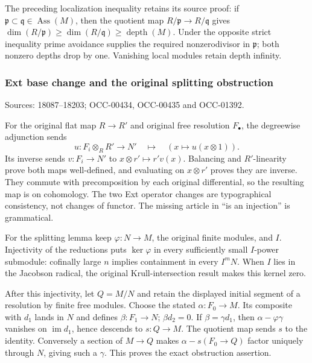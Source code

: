 The preceding localization inequality retains its source proof: if \(\mathfrak p\subset\mathfrak q\in\operatorname{Ass}(M)\), then the quotient map \(R/\mathfrak p\to R/\mathfrak q\) gives \(\dim(R/\mathfrak p)\geq\dim(R/\mathfrak q)\geq\operatorname{depth}(M)\). Under the opposite strict inequality prime avoidance supplies the required nonzerodivisor in \(\mathfrak p\); both nonzero depths drop by one. Vanishing local modules retain depth infinity.

\subsubsection{Ext base change and the original splitting obstruction}\label{algebra-proof-008-ext-base-change-and-the-original-splitting-obstruction}

Sources: 18087--18203; OCC-00434, OCC-00435 and OCC-01392.

For the original flat map \(R\to R'\) and original free resolution \(F_\bullet\), the degreewise adjunction sends \[
u:F_i\otimes_RR'\to N'
\quad\longmapsto\quad (x\mapsto u(x\otimes1)).
\] Its inverse sends \(v:F_i\to N'\) to \(x\otimes r'\mapsto r'v(x)\). Balancing and \(R'\)-linearity prove both maps well-defined, and evaluating on \(x\otimes r'\) proves they are inverse. They commute with precomposition by each original differential, so the resulting map is on cohomology. The two Ext operator changes are typographical consistency, not changes of functor. The missing article in ``is an injection'' is grammatical.

For the splitting lemma keep \(\varphi:N\to M\), the original finite modules, and \(I\). Injectivity of the reductions puts \(\ker\varphi\) in every sufficiently small \(I\)-power submodule: cofinally large \(n\) implies containment in every \(I^mN\). When \(I\) lies in the Jacobson radical, the original Krull-intersection result makes this kernel zero.

After this injectivity, let \(Q=M/N\) and retain the displayed initial segment of a resolution by finite free modules. Choose the stated \(\alpha:F_0\to M\). Its composite with \(d_1\) lands in \(N\) and defines \(\beta:F_1\to N\); \(\beta d_2=0\). If \(\beta=\gamma d_1\), then \(\alpha-\varphi\gamma\) vanishes on \(\operatorname{im}d_1\), hence descends to \(s:Q\to M\). The quotient map sends \(s\) to the identity. Conversely a section of \(M\to Q\) makes \(\alpha-s(F_0\to Q)\) factor uniquely through \(N\), giving such a \(\gamma\). This proves the exact obstruction assertion.

